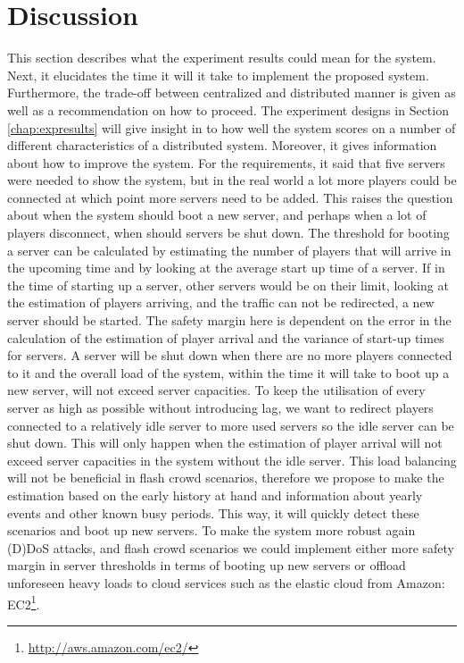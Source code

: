 \section{Discussion}
\label{chap:discussion}
This section describes what the experiment results could mean for the system. Next, it elucidates the time it will it take to implement the proposed system. Furthermore, the trade-off between centralized and distributed manner is given as well as a recommendation on how to proceed.
The experiment designs in Section \ref{chap:expresults} will give insight in to how well the system scores on a number of different characteristics of a distributed system. Moreover, it gives information about how to improve the system. For the requirements, it said that five servers were needed to show the system, but in the real world a lot more players could be connected at which point more servers need to be added. This raises the question about when the system should boot a new server, and perhaps when a lot of players disconnect, when should servers be shut down. The threshold for booting a server can be calculated by estimating the number of players that will arrive in the upcoming time and by looking at the average start up time of a server. If in the time of starting up a server, other servers would be on their limit, looking at the estimation of players arriving, and the traffic can not be redirected, a new server should be started. The safety margin here is dependent on the error in the calculation of the estimation of player arrival and the variance of start-up times for servers. A server will be shut down when there are no more players connected to it and the overall load of the system, within the time it will take to boot up a new server, will not exceed server capacities. To keep the utilisation of every server as high as possible without introducing lag, we want to redirect players connected to a relatively idle server to more used servers so the idle server can be shut down. This will only happen when the estimation of player arrival will not exceed server capacities in the system without the idle server. This load balancing will not be beneficial in flash crowd scenarios, therefore we propose to make the estimation based on the early history at hand and information about  yearly events and other known busy periods. This way, it will quickly detect these scenarios and boot up new servers. To make the system more robust again (D)DoS attacks, and flash crowd scenarios we could implement either more safety margin in server thresholds in terms of booting up new servers or offload unforeseen heavy loads to cloud services such as the elastic cloud from Amazon: EC2\footnote{\url{http://aws.amazon.com/ec2/}}.

